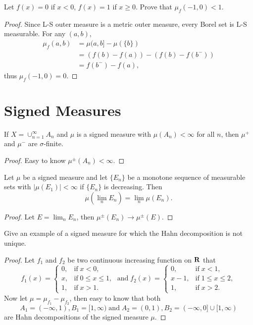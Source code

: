 \begin{pro}%
	Let $f(x)=0$ if $x<0$, $f(x)=1$ if $x\geq 0$. Prove that $\mu_f(-1,0)<1$.
\end{pro}
\begin{proof}
	Since L-S outer measure is a metric outer measure, every Borel set is L-S measurable. For any $(a,b)$,
	\begin{align*}
		\mu_f(a,b)&=\mu(a,b]-\mu(\{b\})\\
		&=(f(b)-f(a))-(f(b)-f(b^-))\\
		&=f(b^-)-f(a),
	\end{align*}
	thus $\mu_f(-1,0)=0$.
\end{proof}

\section{Signed Measures}
\begin{pro}%
	If $X=\cup_{n=1}^\infty A_n$ and $\mu$ is a signed measure with $\mu(A_n)<\infty$ for all $n$, then $\mu^+$ and $\mu^-$ are $\sigma$-finite.
\end{pro}
\begin{proof}
	Easy to know $\mu^{\pm}(A_n)<\infty$.
\end{proof}

\begin{pro}%
	Let $\mu$ be a signed measure and let $\{E_n\}$ be a monotone sequence of measurable sets with $|\mu(E_1)|<\infty$ if $\{E_n\}$ is decreasing. Then
	\[\mu(\lim_n E_n)=\lim_n \mu(E_n).\]
\end{pro}
\begin{proof}
	Let $E=\lim_n E_n$, then $\mu^{\pm}(E_n)\to\mu^{\pm}(E)$.
\end{proof}

\begin{pro}%
	Give an example of a signed measure for which the Hahn decomposition is not unique.
\end{pro}
\begin{proof}
	Let $f_1$ and $f_2$ be two continuous increasing function on $\mathbf{R}$ that
	\[f_1(x)=
	\begin{cases}
		0,&\mbox{if}\; x<0,\\
		x,&\mbox{if}\; 0\leq x\leq 1,\\
		1,&\mbox{if}\; x>1.
	\end{cases}\;\mbox{and}\;
	f_2(x)=
	\begin{cases}
		0,&\mbox{if}\; x<1,\\
		x-1,&\mbox{if}\; 1\leq x\leq 2,\\
		1,&\mbox{if}\; x>2.
	\end{cases}
	\]
 Now let $\mu=\mu_{f_1}-\mu_{f_2}$, then easy to know that both \[A_1=(-\infty,1),B_1=[1,\infty)\; \mbox{and} \;A_2=(0,1),B_2=(-\infty,0]\cup[1,\infty)\] are Hahn decompositions of the signed measure $\mu$.
\end{proof}

